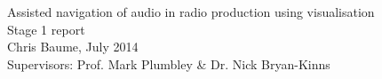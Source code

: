 \documentclass[11pt,a4paper]{article}
\begin{document}
\begin{titlepage}
  \vspace*{\fill}
  \begin{center}
    {\Huge Assisted navigation of audio in radio production using visualisation}\\[0.5cm]
    {\Large Stage 1 report}\\[1cm]
    {\large Chris Baume, July 2014}\\[0.8cm]
    {\small Supervisors: Prof. Mark Plumbley \& Dr. Nick Bryan-Kinns}
  \end{center}
  \vspace*{\fill}
\end{titlepage}

{\singlespacing
\tableofcontents
}
















\begin{appendices}
  
  
  
\end{appendices}
\end{document}
